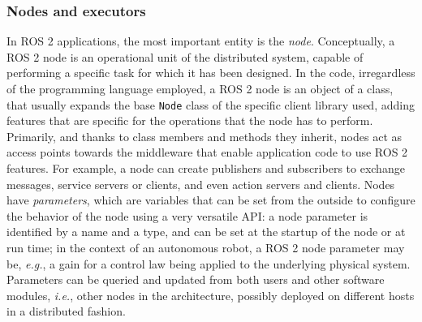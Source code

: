 \subsubsection{Nodes and executors}
\label{sec:ros2_nodes}
In ROS 2 applications, the most important entity is the \emph{node}. Conceptually, a ROS 2 node is an operational unit of the distributed system, capable of performing a specific task for which it has been designed. In the code, irregardless of the programming language employed, a ROS 2 node is an object of a class, that usually expands the base \texttt{Node} class of the specific client library used, adding features that are specific for the operations that the node has to perform. Primarily, and thanks to class members and methods they inherit, nodes act as access points towards the middleware that enable application code to use ROS 2 features. For example, a node can create publishers and subscribers to exchange messages, service servers or clients, and even action servers and clients. Nodes have \emph{parameters}, which are variables that can be set from the outside to configure the behavior of the node using a very versatile API: a node parameter is identified by a name and a type, and can be set at the startup of the node or at run time; in the context of an autonomous robot, a ROS 2 node parameter may be, \emph{e.g.}, a gain for a control law being applied to the underlying physical system. Parameters can be queried and updated from both users and other software modules, \emph{i.e.}, other nodes in the architecture, possibly deployed on different hosts in a distributed fashion.

